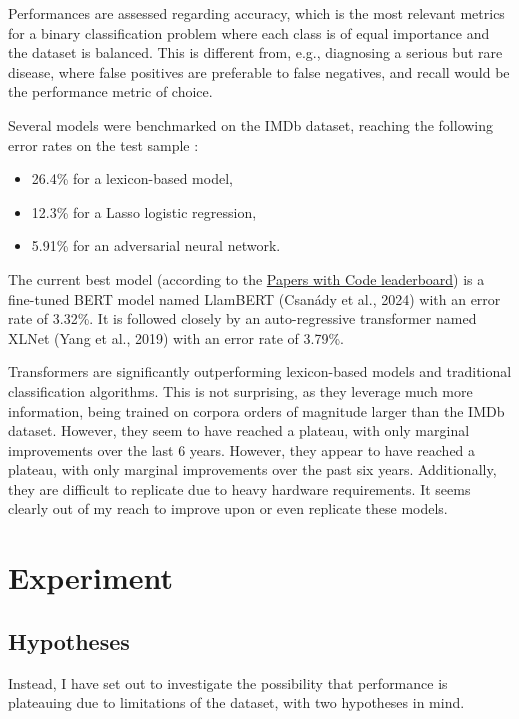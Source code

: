 \documentclass{article}
\begin{document}
Performances are assessed regarding accuracy, which is the most relevant metrics for a binary classification problem where each class is of equal importance and the dataset is balanced. This is different from, e.g., diagnosing a serious but rare disease, where false positives are preferable to false negatives, and recall would be the performance metric of choice.

Several models were benchmarked on the IMDb dataset, reaching the following error rates on the test sample \citep{stine_sentiment_2019}:
\begin{itemize}
    \item 26.4\% for a lexicon-based model,
	\item 12.3\% for a Lasso logistic regression,
	\item 5.91\% for an adversarial neural network.
\end{itemize}

The current best model (according to the \href{https://paperswithcode.com/sota/sentiment-analysis-on-imdb}{Papers with Code leaderboard}) is a fine-tuned BERT model named LlamBERT (Csanády et al., 2024) with an error rate of 3.32\%. It is followed closely by an auto-regressive transformer named XLNet (Yang et al., 2019) with an error rate of 3.79\%.

Transformers are significantly outperforming lexicon-based models and traditional classification algorithms. This is not surprising, as they leverage much more information, being trained on corpora orders of magnitude larger than the IMDb dataset. However, they seem to have reached a plateau, with only marginal improvements over the last 6 years. However, they appear to have reached a plateau, with only marginal improvements over the past six years. Additionally, they are difficult to replicate due to heavy hardware requirements. It seems clearly out of my reach to improve upon or even replicate these models.

\section{Experiment}

\subsection{Hypotheses}

Instead, I have set out to investigate the possibility that performance is plateauing due to limitations of the dataset, with two hypotheses in mind.
\end{document}
